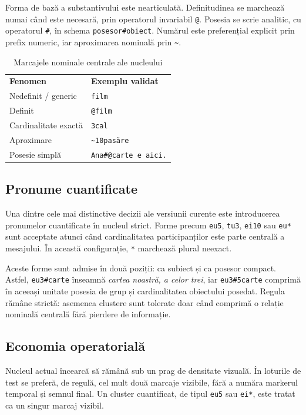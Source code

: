 \documentclass[12pt,onecolumn,letterpaper]{article}
\newcommand{\rs}[1]{\texttt{#1}}
\newcommand{\RStablelayout}{%
\footnotesize
\setlength{\tabcolsep}{6pt}%
\renewcommand{\arraystretch}{1.12}%
\arrayrulecolor{RSRule}%
}
\begin{document}
Forma de bază a substantivului este nearticulată. Definitudinea se marchează
numai când este necesară, prin operatorul invariabil \rs{@}. Posesia se scrie
analitic, cu operatorul \rs{\#}, în schema \rs{posesor\#obiect}. Numărul este
preferențial explicit prin prefix numeric, iar aproximarea nominală prin
\rs{\textasciitilde{}}.

\begin{table}[h!]
\centering
\RStablelayout
\begin{tabularx}{\linewidth}{@{}lY@{}}
\textbf{Fenomen} & \textbf{Exemplu validat} \\
Nedefinit / generic & \rs{film} \\
Definit & \rs{@film} \\
Cardinalitate exactă & \rs{3cal} \\
Aproximare & \rs{\textasciitilde10pasăre} \\
Posesie simplă & \rs{Ana\#@carte e aici.} \\
\bottomrule
\end{tabularx}
\caption{Marcajele nominale centrale ale nucleului}
\end{table}

\subsection{Pronume cuantificate}

Una dintre cele mai distinctive decizii ale versiunii curente este introducerea
pronumelor cuantificate în nucleul strict. Forme precum \rs{eu5}, \rs{tu3},
\rs{ei10} sau \rs{eu*} sunt acceptate atunci când cardinalitatea
participanților este parte centrală a mesajului. În această configurație,
\rs{*} marchează plural neexact.

Aceste forme sunt admise în două poziții: ca subiect și ca posesor compact.
Astfel, \rs{eu3\#carte} înseamnă \textit{cartea noastră, a celor trei}, iar
\rs{eu3\#5carte} comprimă în aceeași unitate posesia de grup și cardinalitatea
obiectului posedat. Regula rămâne strictă: asemenea clustere sunt tolerate doar
când comprimă o relație nominală centrală fără pierdere de informație.

\subsection{Economia operatorială}

Nucleul actual încearcă să rămână sub un prag de densitate vizuală. În loturile
de test se preferă, de regulă, cel mult două marcaje vizibile, fără a număra
markerul temporal și semnul final. Un cluster cuantificat, de tipul \rs{eu5} sau
\rs{ei*}, este tratat ca un singur marcaj vizibil.
\end{document}
